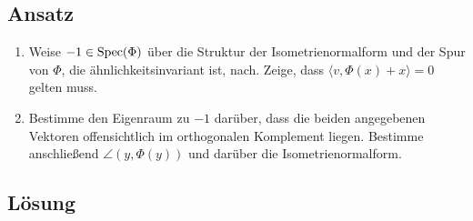 \subsection{Ansatz}
\begin{enumerate}
	\item Weise \( -1 \in \text{Spec}(\Phi) \) über die Struktur der Isometrienormalform und der Spur von \( \Phi \), die ähnlichkeitsinvariant ist, nach. Zeige, dass \( \langle v,\Phi(x)+x \rangle = 0 \) gelten muss.
	\item Bestimme den Eigenraum zu \( -1 \) darüber, dass die beiden angegebenen Vektoren offensichtlich im orthogonalen Komplement liegen. Bestimme anschließend \( \angle(y,\Phi(y)) \) und darüber die Isometrienormalform.
\end{enumerate}

\subsection{Lösung}

